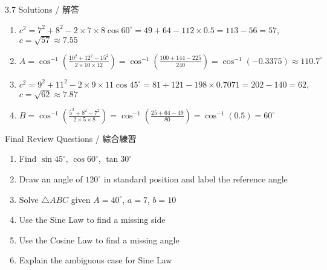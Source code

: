\documentclass[aspectratio=169]{beamer}
\begin{document}
\begin{frame}{3.7 Solutions / 解答}
    \begin{tcolorbox}[colback=lightgray,colframe=accent,title=Solutions]
        \footnotesize
        \begin{enumerate}
            \item $c^2 = 7^2 + 8^2 - 2 \times 7 \times 8 \cos 60^\circ = 49 + 64 - 112 \times 0.5 = 113 - 56 = 57$, $c = \sqrt{57} \approx 7.55$
            \item $A = \cos^{-1}\left(\frac{10^2 + 12^2 - 15^2}{2 \times 10 \times 12}\right) = \cos^{-1}\left(\frac{100+144-225}{240}\right) = \cos^{-1}(-0.3375) \approx 110.7^\circ$
            \item $c^2 = 9^2 + 11^2 - 2 \times 9 \times 11 \cos 45^\circ = 81 + 121 - 198 \times 0.7071 = 202 - 140 = 62$, $c = \sqrt{62} \approx 7.87$
            \item $B = \cos^{-1}\left(\frac{5^2 + 8^2 - 7^2}{2 \times 5 \times 8}\right) = \cos^{-1}\left(\frac{25+64-49}{80}\right) = \cos^{-1}(0.5) = 60^\circ$
        \end{enumerate}
    \end{tcolorbox}
\end{frame}

\begin{frame}{Final Review Questions / 綜合練習}
    \begin{tcolorbox}[colback=lightgray,colframe=primary,title=Comprehensive Review]
        \footnotesize
        \begin{enumerate}
            \item Find $\sin 45^\circ$, $\cos 60^\circ$, $\tan 30^\circ$
            \item Draw an angle of $120^\circ$ in standard position and label the reference angle
            \item Solve $\triangle ABC$ given $A=40^\circ$, $a=7$, $b=10$
            \item Use the Sine Law to find a missing side
            \item Use the Cosine Law to find a missing angle
            \item Explain the ambiguous case for Sine Law
        \end{enumerate}
    \end{tcolorbox}
\end{frame}
\end{document}
